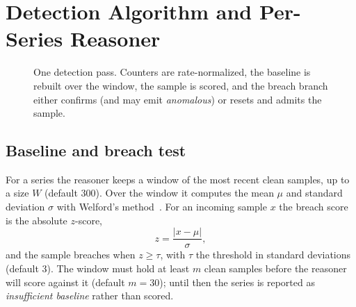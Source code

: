 \section{Detection Algorithm and Per-Series Reasoner}
\label{sec:edge}

\begin{figure}[t]
  \centering
  \caption{One detection pass. Counters are rate-normalized, the baseline is rebuilt
  over the window, the sample is scored, and the breach branch either confirms (and
  may emit \emph{anomalous}) or resets and admits the sample.}
  \label{fig:edge-pipeline}
\end{figure}

\subsection{Baseline and breach test}
For a series the reasoner keeps a window of the most recent clean samples, up to a
size $W$ (default $300$). Over the window it computes the mean $\mu$ and standard
deviation $\sigma$ with Welford's method~\citep{welford1962}. For an incoming
sample $x$ the breach score is the absolute $z$-score,
\begin{equation}
  z = \frac{\lvert x - \mu \rvert}{\sigma},
\end{equation}
and the sample breaches when $z \ge \tau$, with $\tau$ the threshold in standard
deviations (default $3$). The window must hold at least $m$ clean samples before
the reasoner will score against it (default $m = 30$); until then the series is
reported as \emph{insufficient baseline} rather than scored.

